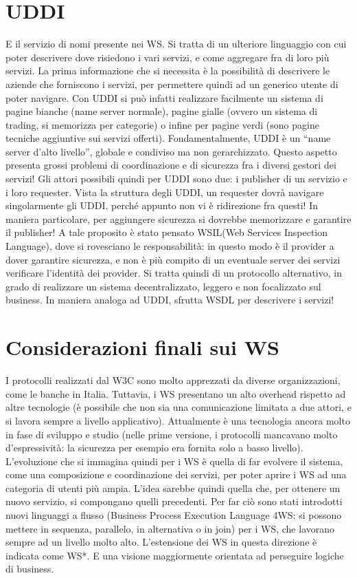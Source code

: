 \section{UDDI}
E il servizio di nomi presente nei WS. Si tratta di un ulteriore linguaggio con cui poter descrivere dove risiedono i
vari servizi, e come aggregare fra di loro più servizi. La prima informazione che si necessita è la possibilità di
descrivere le aziende che forniscono i servizi, per permettere quindi ad un generico utente di poter navigare.
Con UDDI si può infatti realizzare facilmente un sistema di pagine bianche (name server normale), pagine gialle
(ovvero un sistema di trading, si memorizza per categorie) o infine per pagine verdi (sono pagine tecniche aggiuntive
sui servizi offerti). Fondamentalmente, UDDI è un ``name server d'alto livello'', globale e condiviso ma non
gerarchizzato. Questo aspetto presenta grossi problemi di coordinazione e di sicurezza fra i diversi gestori dei
servizi!
Gli attori possibili quindi per UDDI sono due: i publisher di un servizio e i loro requester. Vista la struttura degli
UDDI, un requester dovrà navigare singolarmente gli UDDI, perché appunto non vi è ridirezione fra questi! In maniera
particolare, per aggiungere sicurezza si dovrebbe memorizzare e garantire il publisher!
A tale proposito è stato pensato WSIL(Web Services Inspection Language), dove si rovesciano le responsabilità: in questo modo è il provider a dover
garantire sicurezza, e non è più compito di un eventuale server dei servizi verificare l'identità dei provider. Si
tratta quindi di un protocollo alternativo, in grado di realizzare un sistema decentralizzato, leggero e non
focalizzato sul business. In maniera analoga ad UDDI, sfrutta WSDL per descrivere i servizi!
\section{Considerazioni finali sui WS}
I protocolli realizzati dal W3C sono molto apprezzati da diverse organizzazioni, come le banche in Italia. Tuttavia,
i WS presentano un alto overhead rispetto ad altre tecnologie (è possibile che non sia una comunicazione limitata a
due attori, e si lavora sempre a livello applicativo). Attualmente è una tecnologia ancora molto in fase di sviluppo
e studio (nelle prime versione, i protocolli mancavano molto d'espressività: la sicurezza per esempio era fornita
solo a basso livello).
L'evoluzione che si immagina quindi per i WS è quella di far evolvere il sistema, come una composizione e coordinazione
dei servizi, per poter aprire i WS ad una categoria di utenti più ampia. L'idea sarebbe quindi quella che, per
ottenere un nuovo servizio, si compongano quelli precedenti. Per far ciò sono stati introdotti nuovi linguaggi a
flusso (Business Process Execution Language 4WS: si possono mettere in sequenza, parallelo, in alternativa o in join)
per i WS, che lavorano sempre ad un livello molto alto. L'estensione dei WS in questa direzione è indicata come WS*.
E una visione maggiormente orientata ad perseguire logiche di business.
